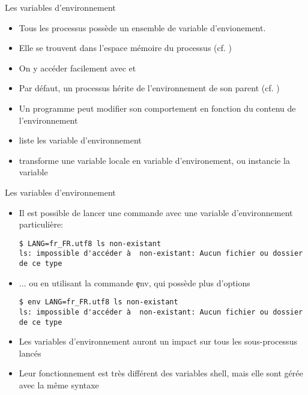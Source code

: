 
\begin{frame}[fragile=singleslide]{Les variables d'environnement}
  \begin{itemize}
  \item   Tous  les   processus  possède   un  ensemble   de  variable
    d'envionement.
  \item  Elle   se  trouvent   dans  l'espace  mémoire   du  processus
    (cf. )
  \item   On   y    accéder   facilement   avec      et
  \item  Par défaut,  un processus  hérite de  l'environnement  de son
    parent (cf. )
  \item  Un programme peut  modifier son  comportement en  fonction du
    contenu de l'environnement
  \item {} liste les variable d'environnement
  \item {} transforme  une variable locale  en variable
    d'environement, ou instancie la variable
  \end{itemize}
\end{frame}

\begin{frame}[fragile=singleslide]{Les variables d'environnement}
  \begin{itemize}
  \item  Il est  possible de  lancer  une commande  avec une  variable
    d'environnement particulière:
    \begin{lstlisting}
$ LANG=fr_FR.utf8 ls non-existant
ls: impossible d'accéder à  non-existant: Aucun fichier ou dossier de ce type
    \end{lstlisting}
  \item  ... ou  en utilisant  la commande  \c{env}, qui  possède plus
    d'options
    \begin{lstlisting}
$ env LANG=fr_FR.utf8 ls non-existant
ls: impossible d'accéder à  non-existant: Aucun fichier ou dossier de ce type
    \end{lstlisting}
  \item Les  variables d'environnement auront  un impact sur  tous les
    sous-processus lancés
  \item Leur  fonctionnement est  très différent des  variables shell,
    mais elle sont gérée avec la même syntaxe
  \end{itemize}
\end{frame}

